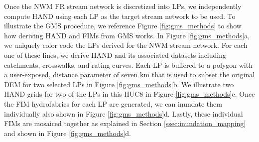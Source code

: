\documentclass[draft]{dependencies/agujournal2019}
\begin{document}
Once the NWM FR stream network is discretized into LPs, we independently compute HAND using each LP as the target stream network to be used.
To illustrate the GMS procedure, we reference Figure \ref{fig:gms_methods} to show how deriving HAND and FIMs from GMS works.
In Figure \ref{fig:gms_methods}a, we uniquely color code the LPs derived for the NWM stream network. 
For each one of these lines, we derive HAND and its associated datasets including catchments, crosswalks, and rating curves.
Each LP is buffered to a polygon with a user-exposed, distance parameter of seven km that is used to subset the original DEM for two selected LPs in Figure \ref{fig:gms_methods}b.
We illustrate two HAND grids for two of the LPs in this HUC8 in Figure \ref{fig:gms_methods}c.
Once the FIM hydrofabrics for each LP are generated, we can inundate them individually also shown in Figure \ref{fig:gms_methods}d.
Lastly, these individual FIMs are mosaiced together as explained in Section \ref{ssec:inundation_mapping} and shown in Figure \ref{fig:gms_methods}d.
\end{document}
